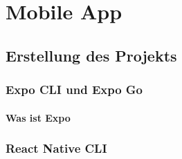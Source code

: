 \part{Mobile App}
\label{mobileApp}

\chapter{Erstellung des Projekts}

\section{Expo CLI und Expo Go}
\subsection{Was ist Expo}


\section{React Native CLI}



